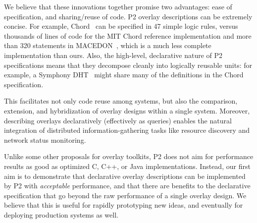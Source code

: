 \documentclass{sig-alt-full}
\def\Sys{P2\xspace}
\def\PChordLines{47\xspace}
\def\MacChordLines{320\xspace}
\newcommand{\note}[1]{}
\begin{document}
\note{Specific advantages (there are 4: 3 corresponding to Goal 1,
and one to Goal 2).}  
We believe that these innovations together promise two advantages:
ease of specification, and sharing/reuse of code. 
\Sys overlay descriptions can be extremely
concise.  For example, Chord~\cite{chord} can be specified in
\PChordLines simple 
logic rules, versus thousands of lines of code for the
MIT Chord reference implementation and more than \MacChordLines 
statements in MACEDON~\cite{rodriguez04macedon}, which is a much less
complete implementation than ours.  Also, the 
high-level, declarative nature of \Sys specifications means that they
decompose cleanly into logically reusable units: for example, a
Symphony DHT~\cite{symphony} might share many of the definitions in the Chord
specification. 
\note{Motivate:} 

This facilitates not only code reuse among systems, but also the
comparison, extension, and hybridization of overlay designs within a
single system.  \note{Sound this note again in
later sections -- one way to look at the multi-DHT case is as a hybrid
of existing proposals.} Moreover, describing overlays declaratively
(effectively as queries) enables the natural integration of
distributed information-gathering tasks like resource discovery and
network status monitoring.  



\note{Framing the evaluation.}
Unlike some other proposals for overlay toolkits, \Sys does not aim
for performance results as good as optimized C, C++, or Java
implementations.  Instead, our first aim is to 
demonstrate that declarative overlay descriptions can be implemented
by \Sys with \emph{acceptable} performance, and that there are
benefits to the declarative specification that go beyond the raw
performance of a single overlay design.  We believe that this is
useful for rapidly prototyping new ideas, and eventually for deploying
production systems as well.
\end{document}
